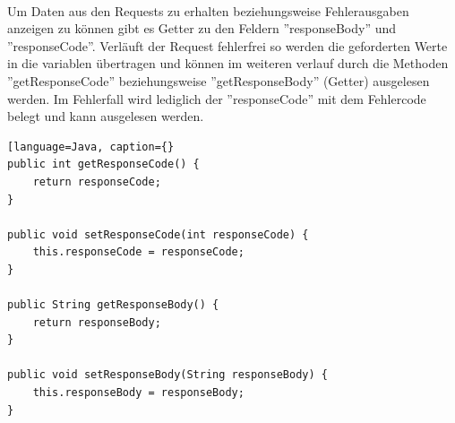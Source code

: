 \cite{OkHttp3}
\\
Um Daten aus den Requests zu erhalten beziehungsweise Fehlerausgaben anzeigen zu können gibt es Getter zu den Feldern ''responseBody'' und ''responseCode''. Verläuft der Request fehlerfrei so werden die geforderten Werte in die variablen übertragen und können im weiteren verlauf durch die Methoden ''getResponseCode'' beziehungsweise ''getResponseBody'' (Getter) ausgelesen werden. Im Fehlerfall wird lediglich der ''responseCode'' mit dem Fehlercode belegt und kann ausgelesen werden. 
\begin{lstlisting}[language=Java, caption={}
public int getResponseCode() {
    return responseCode;
}

public void setResponseCode(int responseCode) {
    this.responseCode = responseCode;
}

public String getResponseBody() {
    return responseBody;
}

public void setResponseBody(String responseBody) {
    this.responseBody = responseBody;
}
\end{lstlisting}

